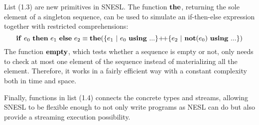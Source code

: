 List (1.3) are new primitives in SNESL.  
The function $\mathbf{the}$, returning the sole element of a singleton sequence, can be used to simulate an if-then-else expression together with restricted comprehensions:
$$\*{if} \ e_0 \ \*{then} \ e_1 \ \*{else} \ e_2 \equiv \*{the}(\RComp{e_1}{e_0}{...} {\++} \RComp{e_2}{\*{not}(e_0)}{...}) $$
The function $\mathbf{empty}$, which tests whether a sequence is empty or not, only needs to check at most one element of the sequence instead of materializing all the element. Therefore, it works in a fairly efficient way with a constant complexity both in time and space.

Finally, functions in list (1.4) connects the concrete types and streams, allowing SNESL to be flexible enough to not only write programs as NESL can do but also provide a streaming execution possibility. 

